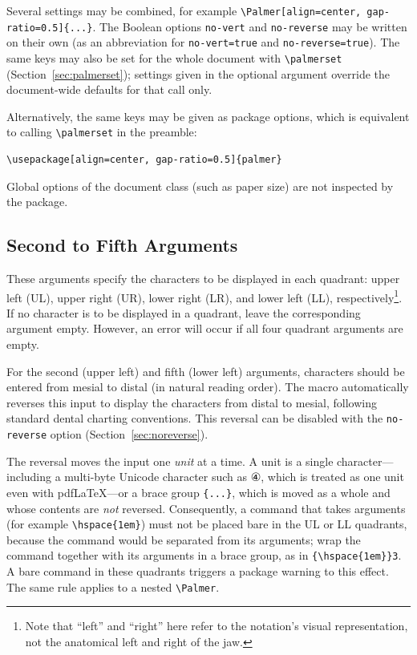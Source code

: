 \documentclass[12pt]{ltjsarticle}
\begin{document}
Several settings may be combined, for example \verb|\Palmer[align=center, gap-ratio=0.5]{...}|. The Boolean options \texttt{no-vert} and \texttt{no-reverse} may be written on their own (as an abbreviation for \texttt{no-vert=true} and \texttt{no-reverse=true}). The same keys may also be set for the whole document with \verb|\palmerset| (Section~\ref{sec:palmerset}); settings given in the optional argument override the document-wide defaults for that call only.

Alternatively, the same keys may be given as package options, which is equivalent to calling \verb|\palmerset| in the preamble:

\begin{verbatim}
\usepackage[align=center, gap-ratio=0.5]{palmer}
\end{verbatim}

\noindent Global options of the document class (such as paper size) are not inspected by the package.


\subsection{Second to Fifth Arguments}

These arguments specify the characters to be displayed in each quadrant: upper left (UL), upper right (UR), lower right (LR), and lower left (LL), respectively\footnote{Note that ``left'' and ``right'' here refer to the notation's visual representation, not the anatomical left and right of the jaw.}. If no character is to be displayed in a quadrant, leave the corresponding argument empty. However, an error will occur if all four quadrant arguments are empty.

For the second (upper left) and fifth (lower left) arguments, characters should be entered from mesial to distal (in natural reading order). The macro automatically reverses this input to display the characters from distal to mesial, following standard dental charting conventions. This reversal can be disabled with the \texttt{no-reverse} option (Section~\ref{sec:noreverse}).

The reversal moves the input one \emph{unit} at a time. A unit is a single character---including a multi-byte Unicode character such as ④, which is treated as one unit even with pdf\LaTeX---or a brace group \verb|{...}|, which is moved as a whole and whose contents are \emph{not} reversed. Consequently, a command that takes arguments (for example \verb|\hspace{1em}|) must not be placed bare in the UL or LL quadrants, because the command would be separated from its arguments; wrap the command together with its arguments in a brace group, as in \verb|{\hspace{1em}}3|. A bare command in these quadrants triggers a package warning to this effect. The same rule applies to a nested \verb|\Palmer|.
\end{document}
